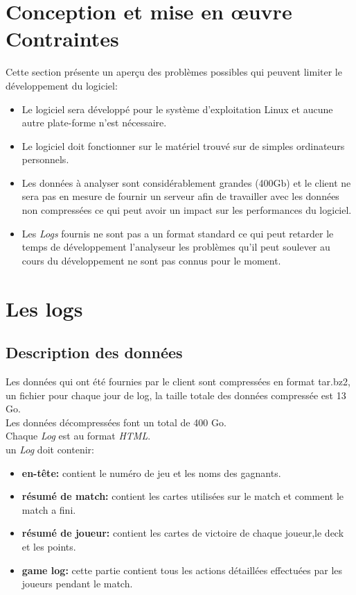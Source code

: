 \documentclass{scrreprt}
\begin{document}
\section{Conception et mise en œuvre Contraintes}
Cette section présente un aperçu des problèmes possibles qui peuvent limiter le développement du logiciel:
\begin{itemize}
\item Le logiciel sera développé pour le système d'exploitation Linux et aucune autre plate-forme n’est nécessaire.
\item Le logiciel doit fonctionner sur le matériel trouvé sur de simples ordinateurs personnels.
\item Les données à analyser sont considérablement grandes (400Gb) et le client ne sera pas en mesure de fournir un serveur afin de travailler avec les données non compressées ce qui peut avoir un impact sur les performances du logiciel.

\item Les \textit{Logs} fournis ne sont pas a un format standard ce qui peut retarder le temps de développement l'analyseur les problèmes qu'il peut soulever au cours du développement ne sont pas connus pour le moment.
\end{itemize}

\section{Les logs}
\subsection{Description des données}
Les données qui ont été fournies par le client sont compressées en format tar.bz2, un fichier pour chaque jour de log, la taille totale des données compressée est 13 Go.\\
Les données décompressées font un total de 400 Go.\\
Chaque \textit{Log} est au format \textit{HTML}.\\
un \textit{Log} doit contenir:
\begin{itemize}
  \item{\textbf{en-tête:}} contient le numéro de jeu et les noms des gagnants.
  \item{\textbf{résumé de  match:}} contient les cartes utilisées sur le match et comment le match a fini.
  \item{\textbf{résumé de joueur:}} contient  les cartes de victoire de chaque joueur,le deck et les points.
  \item{\textbf{game log:}} cette partie contient tous les actions détaillées effectuées par les joueurs pendant le match.

\end{itemize}
\end{document}
